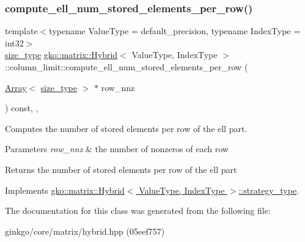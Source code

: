 \subsubsection{\texorpdfstring{compute\+\_\+ell\+\_\+num\+\_\+stored\+\_\+elements\+\_\+per\+\_\+row()}{compute\_ell\_num\_stored\_elements\_per\_row()}}
{\footnotesize\ttfamily template$<$typename Value\+Type = default\+\_\+precision, typename Index\+Type = int32$>$ \\
\hyperlink{namespacegko_a6e5c95df0ae4e47aab2f604a22d98ee7}{size\+\_\+type} \hyperlink{classgko_1_1matrix_1_1Hybrid}{gko\+::matrix\+::\+Hybrid}$<$ Value\+Type, Index\+Type $>$\+::column\+\_\+limit\+::compute\+\_\+ell\+\_\+num\+\_\+stored\+\_\+elements\+\_\+per\+\_\+row (\begin{DoxyParamCaption}\item[{\hyperlink{classgko_1_1Array}{Array}$<$ \hyperlink{namespacegko_a6e5c95df0ae4e47aab2f604a22d98ee7}{size\+\_\+type} $>$ $\ast$}]{row\+\_\+nnz }\end{DoxyParamCaption}) const\hspace{0.3cm}{\ttfamily [inline]}, {\ttfamily [override]}, {\ttfamily [virtual]}}



Computes the number of stored elements per row of the ell part. 


\begin{DoxyParams}{Parameters}
{\em row\+\_\+nnz} & the number of nonzeros of each row\\
\hline
\end{DoxyParams}
\begin{DoxyReturn}{Returns}
the number of stored elements per row of the ell part 
\end{DoxyReturn}


Implements \hyperlink{classgko_1_1matrix_1_1Hybrid_1_1strategy__type_a0a0cd4024f27c7d0f286f35fc0a6de60}{gko\+::matrix\+::\+Hybrid$<$ Value\+Type, Index\+Type $>$\+::strategy\+\_\+type}.



The documentation for this class was generated from the following file\+:\begin{DoxyCompactItemize}
\item 
ginkgo/core/matrix/hybrid.\+hpp (05eef757)\end{DoxyCompactItemize}
